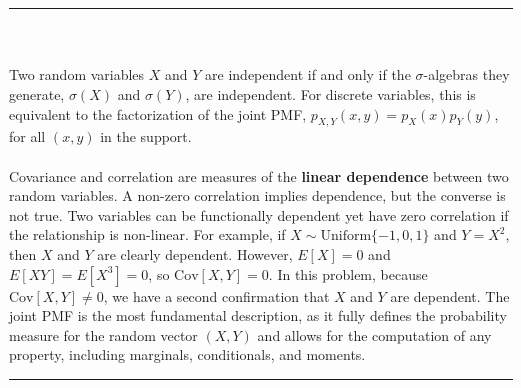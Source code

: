 \documentclass{article}
\begin{document}
\subsubsection*{}

\noindent\rule{\textwidth}{0.4pt}\\

\newpage

\subsubsection*{}
Two random variables $X$ and $Y$ are independent if and only if the $\sigma$-algebras they generate, $\sigma(X)$ and $\sigma(Y)$, are independent. For discrete variables, this is equivalent to the factorization of the joint PMF, $p_{X,Y}(x,y) = p_X(x)p_Y(y)$, for all $(x,y)$ in the support.
\\ \\
Covariance and correlation are measures of the \textbf{linear dependence} between two random variables. A non-zero correlation implies dependence, but the converse is not true. Two variables can be functionally dependent yet have zero correlation if the relationship is non-linear. For example, if $X \sim \text{Uniform}\{-1, 0, 1\}$ and $Y=X^2$, then $X$ and $Y$ are clearly dependent. However, $E[X]=0$ and $E[XY]=E[X^3]=0$, so $\text{Cov}[X,Y]=0$. In this problem, because $\text{Cov}[X,Y] \neq 0$, we have a second confirmation that $X$ and $Y$ are dependent. The joint PMF is the most fundamental description, as it fully defines the probability measure for the random vector $(X, Y)$ and allows for the computation of any property, including marginals, conditionals, and moments.

\noindent\rule{\textwidth}{0.4pt}\\
\end{document}
